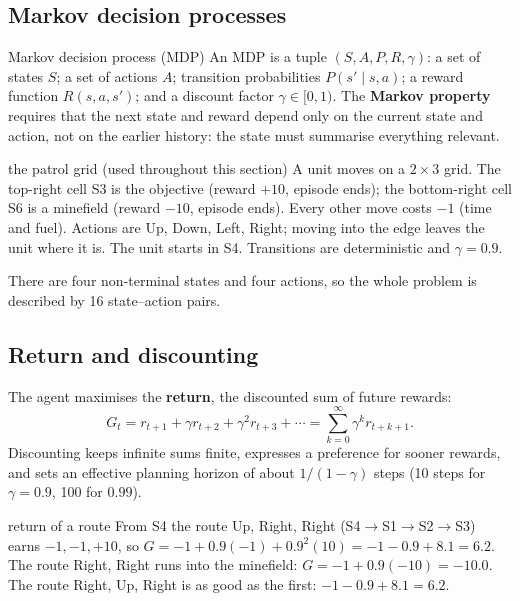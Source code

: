 \documentclass[11pt]{article}
\begin{document}
\subsection{Markov decision processes}
\begin{definition}{Markov decision process (MDP)}
An MDP is a tuple $(S,A,P,R,\gamma)$: a set of states $S$; a set of actions $A$; transition probabilities $P(s'\mid s,a)$; a reward function $R(s,a,s')$; and a discount factor $\gamma\in[0,1)$. The \textbf{Markov property} requires that the next state and reward depend only on the current state and action, not on the earlier history: the state must summarise everything relevant.
\end{definition}
\begin{example}{the patrol grid (used throughout this section)}
A unit moves on a $2\times3$ grid. The top-right cell S3 is the objective (reward $+10$, episode ends); the bottom-right cell S6 is a minefield (reward $-10$, episode ends). Every other move costs $-1$ (time and fuel). Actions are Up, Down, Left, Right; moving into the edge leaves the unit where it is. The unit starts in S4. Transitions are deterministic and $\gamma=0.9$.
\begin{center}\end{center}
There are four non-terminal states and four actions, so the whole problem is described by 16 state--action pairs.
\end{example}

\subsection{Return and discounting}
The agent maximises the \textbf{return}, the discounted sum of future rewards:
\[G_t=r_{t+1}+\gamma r_{t+2}+\gamma^2r_{t+3}+\cdots=\sum_{k=0}^\infty\gamma^kr_{t+k+1}.\]
Discounting keeps infinite sums finite, expresses a preference for sooner rewards, and sets an effective planning horizon of about $1/(1-\gamma)$ steps (10 steps for $\gamma=0.9$, 100 for $0.99$).
\begin{example}{return of a route}
From S4 the route Up, Right, Right (S4$\to$S1$\to$S2$\to$S3) earns $-1,-1,+10$, so $G=-1+0.9(-1)+0.9^2(10)=-1-0.9+8.1=6.2$. The route Right, Right runs into the minefield: $G=-1+0.9(-10)=-10.0$. The route Right, Up, Right is as good as the first: $-1-0.9+8.1=6.2$.
\end{example}
\end{document}
